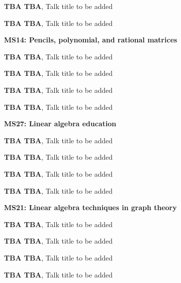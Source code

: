 \documentclass[ILAS2025-program.tex]{subfiles}
\begin{document}
\begin{description}
\begin{description}
        \item[] \textbf{TBA TBA}, Talk title to be added
        \item[] \textbf{TBA TBA}, Talk title to be added
        \end{description}
    \begin{description}
    \item[] \textbf{MS14: Pencils, polynomial, and rational matrices} 
    \item[] \textbf{TBA TBA}, Talk title to be added
        \item[] \textbf{TBA TBA}, Talk title to be added
        \item[] \textbf{TBA TBA}, Talk title to be added
        \item[] \textbf{TBA TBA}, Talk title to be added
        \end{description}
    \begin{description}
    \item[] \textbf{MS27: Linear algebra education} 
    \item[] \textbf{TBA TBA}, Talk title to be added
        \item[] \textbf{TBA TBA}, Talk title to be added
        \item[] \textbf{TBA TBA}, Talk title to be added
        \item[] \textbf{TBA TBA}, Talk title to be added
        \end{description}
    \begin{description}
    \item[] \textbf{MS21: Linear algebra techniques in graph theory} 
    \item[] \textbf{TBA TBA}, Talk title to be added
        \item[] \textbf{TBA TBA}, Talk title to be added
        \item[] \textbf{TBA TBA}, Talk title to be added
        \item[] \textbf{TBA TBA}, Talk title to be added
        \end{description}
    \begin{description}

\end{description}
\end{description}
\end{document}
